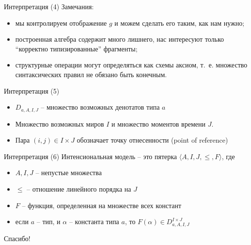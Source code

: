 \documentclass{beamer}
\begin{document}
\begin{frame}{Интерпретация (4)}
Замечания:\\
\bigskip
\begin{itemize}
  \item мы контролируем отображение $g$ и можем сделать его таким, как нам нужно;
  \item построенная алгебра содержит много лишнего, нас интересуют только ``корректно типизированные'' фрагменты;
  \item структурные операции могут определяться как схемы аксиом, т.~е. множество синтаксических правил не обязано быть конечным.
\end{itemize}
\end{frame}

\begin{frame}{Интерпретация (5)}
\begin{itemize}
  \item $D_{a, A, I, J}$ -- множество возможных денотатов типа $a$
  \item Множество возможных миров $I$ и множество моментов времени $J$.
  \item Пара $(i, j) \in I \times J$ обозначает точку отнесенности (point of reference)
\end{itemize}
\end{frame}

\begin{frame}{Интерпретация (6)}
Интенсиональная модель -- это пятерка $\langle A, I, J, \leqslant, F \rangle$, где\ \\
\begin{itemize}
  \item $A, I, J$ -- непустые множества
  \item $\leqslant$ -- отношение линейного порядка на $J$
  \item $F$ -- функция, определенная на множестве всех констант
  \item если $a$ -- тип, и $\alpha$ -- константа типа $a$, то $F(\alpha) \in D_{a, A, I, J}^{I \times J}$
\end{itemize}
\end{frame}

\begin{frame}{}
    \thispagestyle{empty}
    \begin{center}
        {\large Спасибо!}
    \end{center}
\end{frame}


\end{document}
